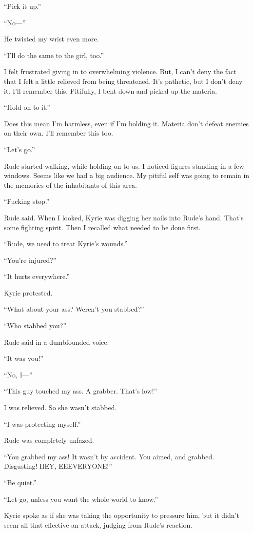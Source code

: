 \documentclass[oneside]{book}
\begin{document}
“Pick it up.”

“No—”

He twisted my wrist even more.

“I’ll do the same to the girl, too.”

I felt frustrated giving in to overwhelming violence. But, I can’t deny the fact that I felt a little relieved from being threatened. It’s pathetic, but I don’t deny it. I’ll remember this. Pitifully, I bent down and picked up the materia.

“Hold on to it.”

Does this mean I’m harmless, even if I’m holding it. Materia don’t defeat enemies on their own. I’ll remember this too.

“Let’s go.”

Rude started walking, while holding on to us. I noticed figures standing in a few windows. Seems like we had a big audience. My pitiful self was going to remain in the memories of the inhabitants of this area.

“Fucking stop.”

Rude said. When I looked, Kyrie was digging her nails into Rude’s hand. That’s some fighting spirit. Then I recalled what needed to be done first.

“Rude, we need to treat Kyrie’s wounds.”

“You’re injured?”

“It hurts everywhere.”

Kyrie protested.

“What about your ass? Weren’t you stabbed?”

“Who stabbed you?”

Rude said in a dumbfounded voice.

“It was you!”

“No, I—”

“This guy touched my ass. A grabber. That’s low!”

I was relieved. So she wasn’t stabbed.

“I was protecting myself.”

Rude was completely unfazed.

“You grabbed my ass! It wasn’t by accident. You aimed, and grabbed. Disgusting! HEY, EEEVERYONE!”

“Be quiet.”

“Let go, unless you want the whole world to know.”

Kyrie spoke as if she was taking the opportunity to pressure him, but it didn’t seem all that effective an attack, judging from Rude’s reaction.
\end{document}
